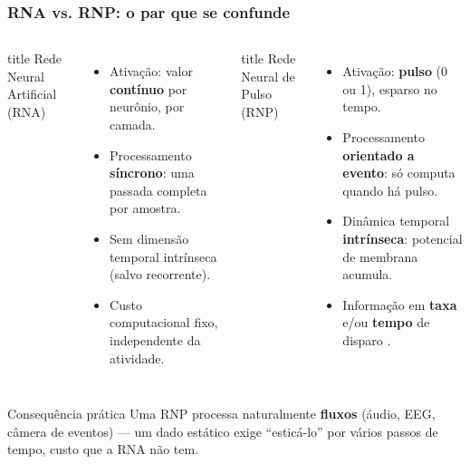 \begin{frame}[shrink]
	\frametitle{RNA vs. RNP: o par que se confunde}
	\small
	\begin{columns}
		\footnotesize
		\begin{beamercolorbox}[sep=4pt,rounded=true,shadow=true]{title}
			Rede Neural Artificial (RNA)
		\end{beamercolorbox}
		\begin{itemize}
			\setlength{\itemsep}{0pt}
			\item Ativação: valor \textbf{contínuo} por neurônio, por camada.
			\item Processamento \textbf{síncrono}: uma passada completa por amostra.
			\item Sem dimensão temporal intrínseca (salvo recorrente).
			\item Custo computacional fixo, independente da atividade.
		\end{itemize}
		\begin{beamercolorbox}[sep=4pt,rounded=true,shadow=true]{title}
			Rede Neural de Pulso (RNP)
		\end{beamercolorbox}
		\begin{itemize}
			\setlength{\itemsep}{0pt}
			\item Ativação: \textbf{pulso} (0 ou 1), esparso no tempo.
			\item Processamento \textbf{orientado a evento}: só computa quando há pulso.
			\item Dinâmica temporal \textbf{intrínseca}: potencial de membrana acumula.
			\item Informação em \textbf{taxa} e/ou \textbf{tempo} de disparo \cite{kasabov2019time}.
		\end{itemize}
	\end{columns}
	\vspace{1pt}
	\begin{alertblock}{Consequência prática}
		Uma RNP processa naturalmente \textbf{fluxos} (áudio, EEG, câmera de eventos) --- um dado estático exige ``esticá-lo'' por vários passos de tempo, custo que a RNA não tem.
	\end{alertblock}
\end{frame}
